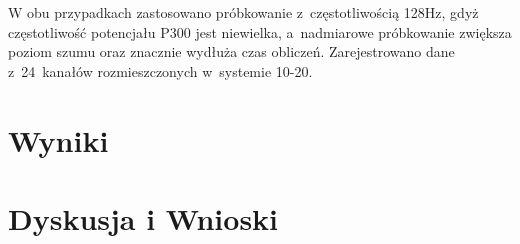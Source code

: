 \documentclass[licencjacka,openright]{pracamgr}
\begin{document}
W obu przypadkach zastosowano próbkowanie z~częstotliwością 128Hz, gdyż częstotliwość potencjału P300 jest niewielka, a~nadmiarowe próbkowanie zwiększa poziom szumu oraz znacznie wydłuża czas obliczeń. Zarejestrowano dane z~24~kanałów rozmieszczonych w~systemie 10-20.



\chapter{Wyniki}

\chapter{Dyskusja i Wnioski}



\end{document}
